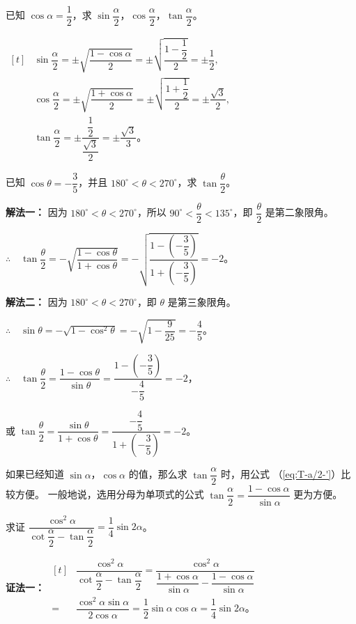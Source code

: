 \jiange
\liti 已知 $\cos\alpha = \dfrac 1 2$，求 $\sin\dfrac{\alpha}{2}$，$\cos\dfrac{\alpha}{2}$，$\tan\dfrac{\alpha}{2}$。\jiange

\jie $\begin{aligned}[t]
    & \sin\dfrac{\alpha}{2} = \pm\sqrt{\dfrac{1 - \cos\alpha}{2}} = \pm\sqrt{\dfrac{1 - \dfrac 1 2}{2}} = \pm\dfrac 1 2 \text{,} \\
    & \cos\dfrac{\alpha}{2} = \pm\sqrt{\dfrac{1 + \cos\alpha}{2}} = \pm\sqrt{\dfrac{1 + \dfrac 1 2}{2}} = \pm\dfrac{\sqrt 3} 2 \text{,} \\
    & \tan\dfrac{\alpha}{2} = \pm\dfrac{\dfrac 1 2}{\dfrac{\sqrt 3} 2} = \pm\dfrac{\sqrt 3}{3} \text{。}
\end{aligned}$ \jiange

\liti 已知 $\cos\theta = -\dfrac 3 5$，并且 $180^\circ < \theta < 270^\circ$，求 $\tan\dfrac{\theta}{2}$。

\textbf{解法一：} 因为 $180^\circ < \theta < 270^\circ$，所以 $90^\circ < \dfrac{\theta}{2} < 135^\circ$，即 $\dfrac{\theta}{2}$ 是第二象限角。

$\therefore \quad \tan\dfrac{\theta}{2} = -\sqrt{\dfrac{1 - \cos\theta}{1 + \cos\theta}} = -\sqrt{\dfrac{1 - \left(-\dfrac 3 5\right)}{1 + \left(-\dfrac 3 5\right)}} = -2$。\jiange

\textbf{解法二：} 因为 $180^\circ < \theta < 270^\circ$，即 $\theta$ 是第三象限角。\jiange

$\therefore \quad \sin\theta = -\sqrt{1 - \cos^2\theta} = -\sqrt{1 - \dfrac{9}{25}} = -\dfrac 4 5$。\jiange

$\therefore \quad \tan\dfrac{\theta}{2} = \dfrac{1 - \cos\theta}{\sin\theta} = \dfrac{1 - \left(-\dfrac 3 5\right)}{-\dfrac 4 5} = -2$，\jiange

或 $\tan\dfrac{\theta}{2} = \dfrac{\sin\theta}{1 + \cos\theta} = \dfrac{-\dfrac 4 5}{1 + \left(-\dfrac 3 5\right)} = -2$。

如果已经知道 $\sin\alpha$，$\cos\alpha$ 的值，那么求 $\tan\dfrac{\alpha}{2}$ 时，用公式 （\ref{eq:T-a/2-'}）比较方便。
一般地说，选用分母为单项式的公式 $\tan\dfrac{\alpha}{2} = \dfrac{1 - \cos\alpha}{\sin\alpha}$ 更为方便。 \jiange

\liti 求证 $\dfrac{\cos^2\alpha}{\cot\dfrac{\alpha}{2} - \tan\dfrac{\alpha}{2}} = \dfrac 1 4 \sin2\alpha$。\jiange

\textbf{证法一：} $\begin{aligned}[t]
    & \dfrac{\cos^2\alpha}{\cot\dfrac{\alpha}{2} - \tan\dfrac{\alpha}{2}} = \dfrac{\cos^2\alpha}{\dfrac{1 + \cos\alpha}{\sin\alpha} - \dfrac{1 - \cos\alpha}{\sin\alpha}} \\
    =& \dfrac{\cos^2\alpha \sin\alpha}{2\cos\alpha} = \dfrac 1 2 \sin\alpha \cos\alpha = \dfrac 1 4 \sin2\alpha \text{。}
\end{aligned}$ \jiange

